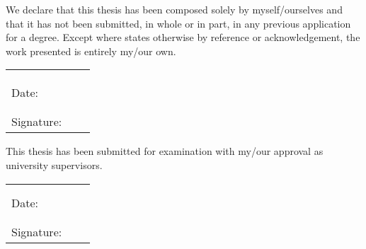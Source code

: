 
\cleardoublepage  %

We declare that this thesis has been composed solely by myself/ourselves and that it has not been submitted, in whole or in part, in any previous application for a degree. 
Except where states otherwise by reference or acknowledgement, the work presented is entirely my/our own.

\bigskip

\begin{tabular}{lcc}

	& \AuthorA & \ShowAuthorB \\
	& \AuthorAID & \ShowAuthorBID \\
	
	& & \\ %
	
	Date: &  \dotfill & \dotfill \\ 
	
	& & \\ %
	& & \\ %
	
	Signature: & \dotfill & \dotfill \\ 
	
\end{tabular}

\vspace{1cm}

This thesis has been submitted for examination with my/our approval as university supervisors.

\bigskip

\begin{tabular}{lcc}
	
	& \SupervisorA & \SupervisorB \\
	
	& & \\ %
	
	Date: &  \dotfill & \dotfill \\ 
	
	& & \\ %
	& & \\ %
	
	Signature: & \dotfill & \dotfill \\ 
	
\end{tabular}